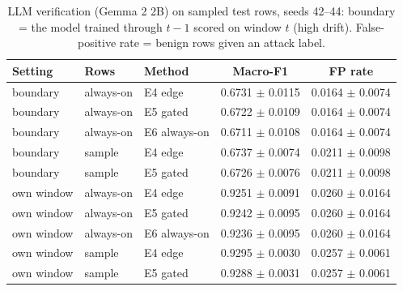 \begin{table}[t]
\centering
\caption{LLM verification (Gemma 2 2B) on sampled test rows, seeds 42--44: boundary = the model trained through $t-1$ scored on window $t$ (high drift). False-positive rate = benign rows given an attack label.}
\label{tab:llm}
\begin{tabular}{lllcc}
\toprule
Setting & Rows & Method & Macro-F1 & FP rate \\
\midrule
boundary & always-on & E4 edge & 0.6731 $\pm$ 0.0115 & 0.0164 $\pm$ 0.0074 \\
boundary & always-on & E5 gated & 0.6722 $\pm$ 0.0109 & 0.0164 $\pm$ 0.0074 \\
boundary & always-on & E6 always-on & 0.6711 $\pm$ 0.0108 & 0.0164 $\pm$ 0.0074 \\
boundary & sample & E4 edge & 0.6737 $\pm$ 0.0074 & 0.0211 $\pm$ 0.0098 \\
boundary & sample & E5 gated & 0.6726 $\pm$ 0.0076 & 0.0211 $\pm$ 0.0098 \\
own window & always-on & E4 edge & 0.9251 $\pm$ 0.0091 & 0.0260 $\pm$ 0.0164 \\
own window & always-on & E5 gated & 0.9242 $\pm$ 0.0095 & 0.0260 $\pm$ 0.0164 \\
own window & always-on & E6 always-on & 0.9236 $\pm$ 0.0095 & 0.0260 $\pm$ 0.0164 \\
own window & sample & E4 edge & 0.9295 $\pm$ 0.0030 & 0.0257 $\pm$ 0.0061 \\
own window & sample & E5 gated & 0.9288 $\pm$ 0.0031 & 0.0257 $\pm$ 0.0061 \\
\bottomrule
\end{tabular}
\end{table}
